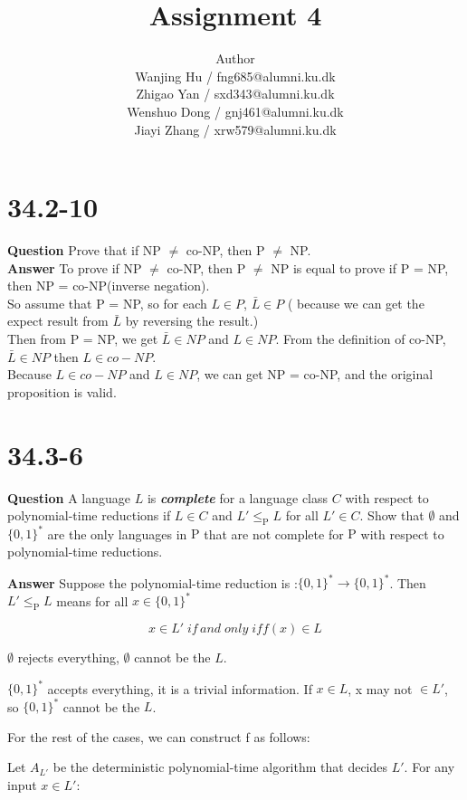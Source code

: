 \documentclass[12pt]{article}
\title{Assignment 4}
\author{Author \\
  Wanjing Hu / fng685@alumni.ku.dk  \\
  Zhigao Yan / sxd343@alumni.ku.dk  \\
  Wenshuo Dong / gnj461@alumni.ku.dk  \\
  Jiayi Zhang / xrw579@alumni.ku.dk \\
}
\begin{document}
\maketitle

\section{34.2-10}
\textbf{Question}
Prove that if NP $\neq$ co-NP,  then P $\neq$ NP.\\

\textbf{Answer}
To prove if NP $\neq$ co-NP,  then P $\neq$ NP is equal to prove if P = NP, then NP = co-NP(inverse negation).\\
So assume that P = NP, so for each $L \in P$, $\bar{L} \in P$ ( because we can get the expect result from $\bar{L}$ by reversing the result.)\\
Then from P = NP, we get  $\bar{L} \in NP$ and $L \in NP$.
From the definition of co-NP, $\bar{L} \in NP$ then $L \in co-NP$.\\
Because $L \in co-NP$ and $L \in NP$, we can get NP = co-NP, and the original proposition is valid.


\section{34.3-6}
\textbf{Question}
 A language $L$ is \textit{\textbf{complete}} for a language class $C$ with respect to polynomial-time reductions if $L \in C$ and $L' \le_\text{P} L$ for all $L' \in C$. Show that $\emptyset$ and $\{0, 1\}^{*}$ are the only languages in $\text{P}$ that are not complete for $\text{P}$ with respect to polynomial-time reductions.

\textbf{Answer}
Suppose the polynomial-time reduction is :$\{0, 1\}^{*} \rightarrow \{0, 1\}^{*}$. Then $L' \le_\text{P} L$ means for all $x \in \{0,1\}^{*}$

\begin{equation}
x \in L' \; if \, and \; only \; if f(x) \in  L
\end{equation}

$\emptyset$ rejects everything, $\emptyset$  cannot be the $L$.

$\{0, 1\}^{*}$ accepts everything, it is a trivial information. If $x \in L$, x may not $\in L'$, so  $\{0, 1\}^{*}$  cannot be the $L$.

For the rest of the cases, we can construct f as follows:

Let $A_{L'}$ be the deterministic polynomial-time algorithm that decides $L'$. For any input $x \in L'$:
\end{document}

